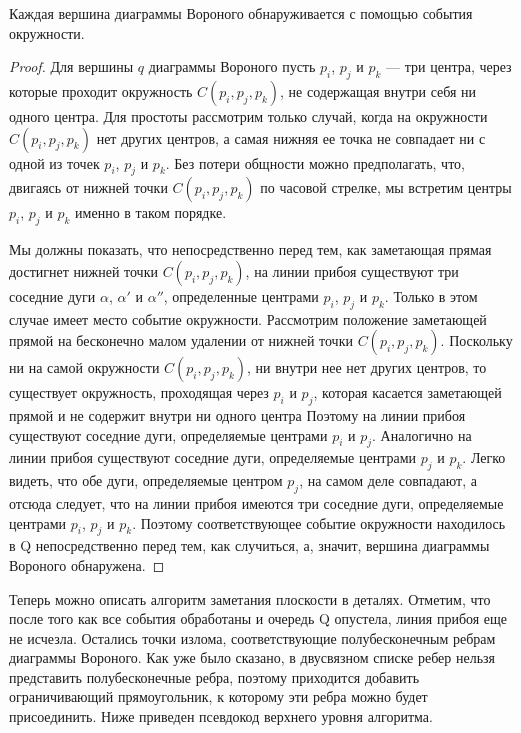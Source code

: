 \begin{lemma}
    Каждая  вершина  диаграммы  Вороного  обнаруживается  с  помощью события  окружности.
\end{lemma}
\begin{proof}
    Для  вершины  $q$  диаграммы  Вороного  пусть  $p_i$, $p_j$ и $p_k$ --- три  центра,  через  которые  проходит  окружность  $C(p_i, p_j, p_k)$,  не  содержащая  внутри  себя  ни одного  центра.
    Для  простоты  рассмотрим  только  случай,  когда  на  окружности  $C(p_i, p_j, p_k)$  нет  других  центров,  а  самая  нижняя  ее  точка  не  совпадает  ни  с  одной  из  точек $p_i$, $p_j$ и $p_k$.
    Без потери  общности  можно  предполагать,  что,  двигаясь  от  нижней  точки $C(p_i, p_j, p_k)$ по  часовой  стрелке,  мы  встретим  центры $p_i$, $p_j$ и $p_k$ именно  в  таком  порядке.

    Мы  должны  показать,  что  непосредственно  перед тем,  как  заметающая  прямая  достигнет  нижней  точки $C(p_i, p_j, p_k)$,  на  линии  прибоя  существуют  три  соседние дуги  $\alpha$, $\alpha'$ и $\alpha''$,  определенные  центрами $p_i$, $p_j$ и $p_k$.
    Только  в этом  случае  имеет  место  событие  окружности.  
    Рассмотрим  положение  заметающей  прямой  на  бесконечно малом  удалении  от  нижней  точки  $C(p_i, p_j, p_k)$.
    Поскольку  ни  на  самой  окружности  $C(p_i, p_j, p_k)$,  ни  внутри  нее нет  других  центров,  то  существует  окружность,  проходящая  через $p_i$ и $p_j$, которая касается  заметающей  прямой  и  не  содержит  внутри  ни  одного  центра
    Поэтому  на линии  прибоя  существуют  соседние  дуги,  определяемые  центрами  $p_i$ и $p_j$.
    Аналогично  на  линии  прибоя  существуют  соседние  дуги,  определяемые  центрами $p_j$ и $p_k$. 
    Легко  видеть,  что  обе  дуги,  определяемые  центром $p_j$, на  самом  деле  совпадают,  а отсюда  следует,  что  на  линии  прибоя  имеются  три  соседние  дуги,  определяемые центрами  $p_i$, $p_j$ и $p_k$.
    Поэтому  соответствующее  событие  окружности  находилось  в Q  непосредственно  перед  тем,  как  случиться,  а,  значит,  вершина  диаграммы  Вороного  обнаружена.
\end{proof}

Теперь  можно  описать  алгоритм  заметания  плоскости  в  деталях.
Отметим,  что после  того  как  все  события  обработаны  и  очередь  Q  опустела,  линия  прибоя  еще  не исчезла.
Остались  точки  излома,  соответствующие  полубесконечным  ребрам  диаграммы  Вороного.
Как  уже  было  сказано,  в  двусвязном  списке  ребер  нельзя  представить  полубесконечные  ребра,  поэтому  приходится  добавить  ограничивающий прямоугольник,  к  которому  эти  ребра  можно  будет  присоединить.
Ниже  приведен псевдокод  верхнего  уровня  алгоритма.

